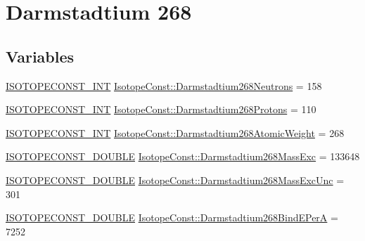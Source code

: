 \hypertarget{group___isotope_const-_darmstadtium-_ds268}{}\section{Darmstadtium 268}
\label{group___isotope_const-_darmstadtium-_ds268}
\subsection*{Variables}
\begin{DoxyCompactItemize}
\item 
\mbox{\hyperlink{group___isotope_const-_macros_ga5f18360b3e99483a35c32d789e62621c}{I\+S\+O\+T\+O\+P\+E\+C\+O\+N\+S\+T\+\_\+\+I\+NT}} \mbox{\hyperlink{group___isotope_const-_darmstadtium-_ds268_ga68c47ac3cdd90ea751953c0a34265999}{Isotope\+Const\+::\+Darmstadtium268\+Neutrons}} = 158
\item 
\mbox{\hyperlink{group___isotope_const-_macros_ga5f18360b3e99483a35c32d789e62621c}{I\+S\+O\+T\+O\+P\+E\+C\+O\+N\+S\+T\+\_\+\+I\+NT}} \mbox{\hyperlink{group___isotope_const-_darmstadtium-_ds268_ga7932a86962d295422cdf2a6105951e1b}{Isotope\+Const\+::\+Darmstadtium268\+Protons}} = 110
\item 
\mbox{\hyperlink{group___isotope_const-_macros_ga5f18360b3e99483a35c32d789e62621c}{I\+S\+O\+T\+O\+P\+E\+C\+O\+N\+S\+T\+\_\+\+I\+NT}} \mbox{\hyperlink{group___isotope_const-_darmstadtium-_ds268_gad6aab6288136e6340f53a201def37b15}{Isotope\+Const\+::\+Darmstadtium268\+Atomic\+Weight}} = 268
\item 
\mbox{\hyperlink{group___isotope_const-_macros_ga8f45a7272ce02c0b4c65c44636ed719a}{I\+S\+O\+T\+O\+P\+E\+C\+O\+N\+S\+T\+\_\+\+D\+O\+U\+B\+LE}} \mbox{\hyperlink{group___isotope_const-_darmstadtium-_ds268_gabc6ad0db2a2dc7f608ba23f34d841f10}{Isotope\+Const\+::\+Darmstadtium268\+Mass\+Exc}} = 133648
\item 
\mbox{\hyperlink{group___isotope_const-_macros_ga8f45a7272ce02c0b4c65c44636ed719a}{I\+S\+O\+T\+O\+P\+E\+C\+O\+N\+S\+T\+\_\+\+D\+O\+U\+B\+LE}} \mbox{\hyperlink{group___isotope_const-_darmstadtium-_ds268_gaf6bfbe85d64177a1e93b1f35f312a9b7}{Isotope\+Const\+::\+Darmstadtium268\+Mass\+Exc\+Unc}} = 301
\item 
\mbox{\hyperlink{group___isotope_const-_macros_ga8f45a7272ce02c0b4c65c44636ed719a}{I\+S\+O\+T\+O\+P\+E\+C\+O\+N\+S\+T\+\_\+\+D\+O\+U\+B\+LE}} \mbox{\hyperlink{group___isotope_const-_darmstadtium-_ds268_ga6ec72a5b686142f3e62e5d8b722d09ce}{Isotope\+Const\+::\+Darmstadtium268\+Bind\+E\+PerA}} = 7252

\end{DoxyCompactItemize}
